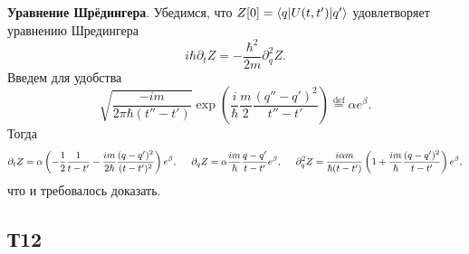 \textbf{Уравнение Шрёдингера}. Убедимся, что $Z[0]=\bk{q}[U(t,t')]{q'}$ удовлетворяет уравнению Шредингера
\begin{equation*}
    i \hbar \partial_t Z = - \frac{\hbar^2}{2m} \partial_q^2 Z.
\end{equation*}
Введем для удобства
\begin{equation*}
    \sqrt{\frac{-i m}{2 \pi \hbar (t'' - t')}} \exp\left(
        \frac{i}{\hbar} \frac{m}{2} \frac{(q'' - q')^2}{t''-t'}
    \right) \overset{\mathrm{def}}{=}  \alpha e^{\beta}.
\end{equation*}
Тогда
\begin{align*}
    \partial_t Z = \alpha \left(- \frac{1}{2}\frac{1}{t-t'} - \frac{i m}{2 \hbar} \frac{(q-q')^2}{(t-t')^2} \right) e^\beta, 
    \hspace{5 mm} 
    \partial_q Z = \alpha \frac{i m}{\hbar} \frac{q-q'}{t-t'} e^\beta, 
    \hspace{5 mm} 
    \partial_q^2 Z = \frac{i \alpha m}{\hbar (t-t')} \left(
        1 + \frac{i m}{\hbar} \frac{(q-q')^2}{t-t'}
    \right)e^\beta,
\end{align*}
что и требовалось доказать.


\newpage

\subsection*{Т12}

